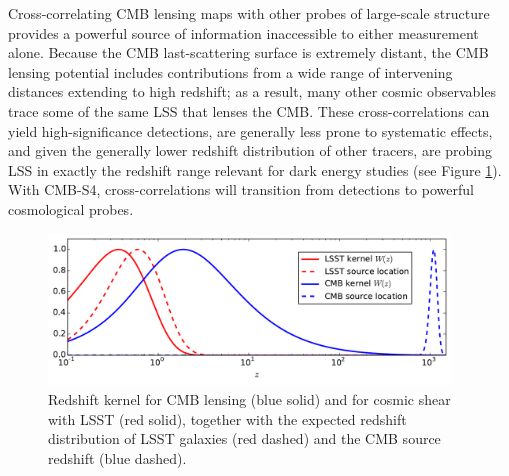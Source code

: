Cross-correlating CMB lensing maps with other probes of large-scale structure provides a powerful source of information inaccessible to either measurement alone.
Because the CMB last-scattering surface is extremely distant, 
the CMB lensing potential includes contributions from a wide range of 
intervening distances extending to high redshift; as a result, many other cosmic observables trace some of the same LSS that lenses the CMB.
These cross-correlations can yield high-significance detections, are generally less prone to systematic effects, and given the generally lower redshift distribution of other tracers, are probing LSS in exactly the redshift
range relevant for dark energy studies (see Figure \ref{cmb-gal-kernels}). 
With CMB-S4, cross-correlations will transition from detections to powerful cosmological probes. 

\begin{figure}[h]
\centering
\includegraphics[width=0.95\textwidth]{CMBLensing/CMB_effs.pdf}
\caption{Redshift kernel for CMB lensing (blue solid) and for cosmic shear with LSST (red solid), together with the expected redshift distribution of LSST galaxies (red dashed) and the CMB source redshift (blue dashed).}
\label{cmb-gal-kernels}
\end{figure}

